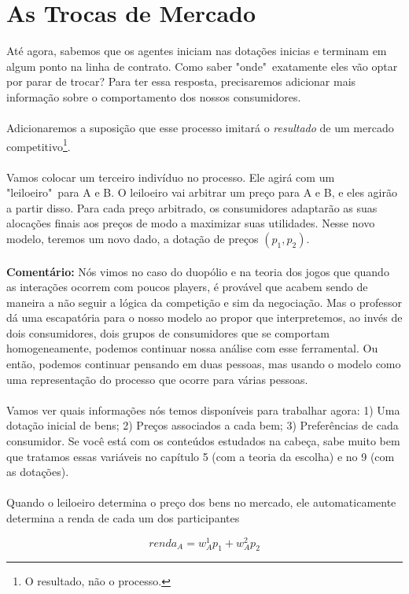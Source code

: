 \documentclass[a4paper,11pt,oneside]{book}
\theoremstyle{definition}
\theoremstyle{break}
\begin{document}
\section{As Trocas de Mercado}

Até agora, sabemos que os agentes iniciam nas dotações inicias e terminam em algum ponto na linha de contrato. Como saber "onde"\ exatamente eles vão optar por parar de trocar? Para ter essa resposta, precisaremos adicionar mais informação sobre o comportamento dos nossos consumidores.
\\~\\
Adicionaremos a suposição que esse processo imitará o \textit{resultado} de um mercado competitivo\footnote{O resultado, não o processo.}.
\\~\\
Vamos colocar um terceiro indivíduo no processo. Ele agirá com um "leiloeiro"\ para A e B. O leiloeiro vai arbitrar um preço para A e B, e eles agirão a partir disso. Para cada preço arbitrado, os consumidores adaptarão as suas alocações finais aos preços de modo a maximizar suas utilidades. Nesse novo modelo, teremos  um novo dado, a dotação de preços $(p_1,p_2)$.
\\~\\
\textbf{Comentário:} Nós vimos no caso do duopólio e na teoria dos jogos que quando as interações ocorrem com poucos players, é provável que acabem sendo de maneira a não seguir a lógica da competição e sim da negociação. Mas o professor dá uma escapatória para o nosso modelo ao propor que interpretemos, ao invés de dois consumidores, dois grupos de consumidores que se comportam homogeneamente, podemos continuar nossa análise com esse ferramental. Ou então, podemos continuar pensando em duas pessoas, mas usando o modelo como uma representação do processo que ocorre para várias pessoas.
\\~\\
Vamos ver quais informações nós temos disponíveis para trabalhar agora: 1) Uma dotação inicial de bens; 2) Preços associados a cada bem; 3) Preferências de cada consumidor. Se você está com os conteúdos estudados na cabeça, sabe muito bem que tratamos essas variáveis no capítulo 5 (com a teoria da escolha) e no 9 (com as dotações).
\\~\\
Quando o leiloeiro determina o preço dos bens no mercado, ele automaticamente determina a renda de cada um dos participantes

$$renda_A = w_A^1 p_1 + w_A^2 p_2$$
\end{document}

